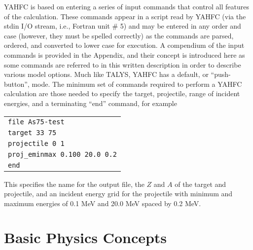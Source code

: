 \documentclass[
10pt,
showpacs,preprintnumbers,footinbib,
amsfonts,amsmath,amssymb,
aps,
prc,twocolumn,groupedaddress,superscriptaddress,
showkeys,
nofootinbib
]{revtex4-1}
\begin{document}
YAHFC is based on entering a series of input commands that control all features of the calculation. These commands appear in a script read by YAHFC (via the stdin I/O stream, i.e., Fortran unit \# 5) and may be entered in any order and case (however, they must be spelled correctly) as the commands are parsed, ordered, and converted to lower case for execution. A compendium of the input commands is provided in the Appendix, and their concept is introduced here as some commands are referred to in this written description in order to describe various model options.  Much like TALYS, YAHFC has a default, or ``push-button'', mode. The minimum set of commands required to perform a YAHFC calculation are those needed to specify the target, projectile, range of incident energies, and a terminating ``end'' command, for example
\begin{center}
\begin{tabular}{| p{7 cm}|}
\hline
{\texttt {file As75-test}}\\
{\texttt {target 33 75}} \\
{\texttt {projectile 0 1}}\\
{\texttt {proj\_eminmax   0.100   20.0  0.2}}\\
{\texttt {end}}\\
\hline
\end{tabular}
\end{center}
This specifies the name for the output file, the $Z$ and $A$ of the target and projectile, and an incident energy grid for the projectile with minimum and maximum energies of 0.1 MeV and 20.0 MeV spaced by 0.2 MeV. 
  
\section{Basic Physics Concepts}
\end{document}
